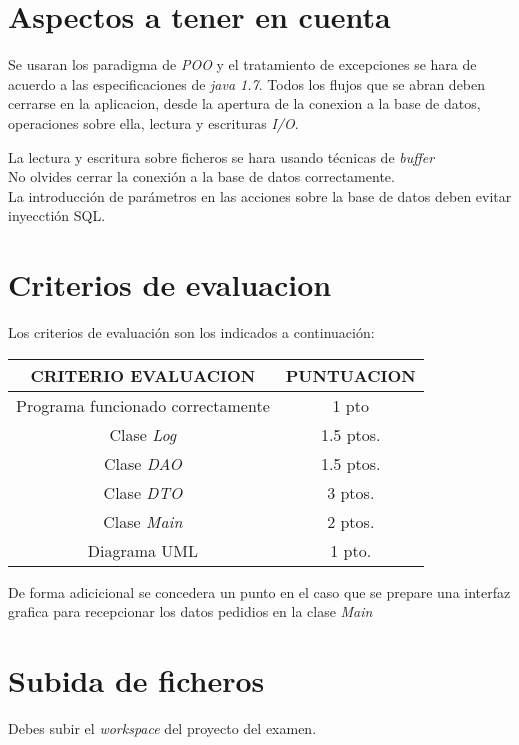 \documentclass[4paper]{article}
\begin{document}
\section*{Aspectos a tener en cuenta}
Se usaran los paradigma de \emph{POO} y el tratamiento de excepciones se hara de acuerdo a las especificaciones de \emph{java 1.7}. Todos los flujos que se abran deben cerrarse en la aplicacion, desde la apertura de la conexion a la base de datos, operaciones sobre ella, lectura y escrituras \emph{I/O}.\par
La lectura y escritura sobre ficheros se hara usando técnicas de \emph{buffer}\\
No olvides cerrar la conexión a la base de datos correctamente.\\
La introducción de parámetros en las acciones sobre la base de datos deben evitar inyecctión SQL.


\section*{Criterios de evaluacion}
Los criterios de evaluación son los indicados a continuación:\par 
\vspace*{0.5cm}
\begin{tabular}{|c|c|}
\hline
\textbf{CRITERIO EVALUACION} & \textbf{PUNTUACION} \\
\hline
Programa funcionado correctamente & 1 pto\\
\hline
Clase \emph{Log} & 1.5 ptos.\\
\hline
Clase \emph{DAO} & 1.5 ptos.\\
\hline
Clase \emph{DTO} & 3 ptos.\\
\hline
Clase \emph{Main} & 2 ptos.\\
\hline
Diagrama UML & 1 pto.\\
\hline

\end{tabular}
\par 
\vspace{0.3cm}
De forma adicicional se concedera un punto en el caso que se prepare una interfaz grafica para recepcionar los datos pedidios en la clase \emph{Main}
\section*{Subida de ficheros}
Debes subir el \emph{workspace} del proyecto del examen.
\end{document}
